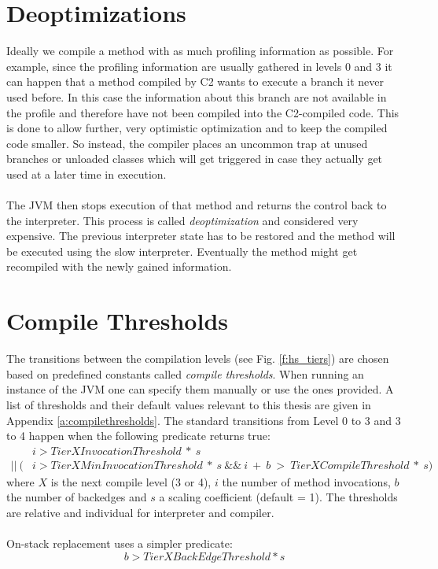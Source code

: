 \section{Deoptimizations}
\label{s:deoptimizations}
Ideally we compile a method with as much profiling information as possible.
For example, since the profiling information are usually gathered in levels 0 and 3 it can happen that a method compiled by C2 wants to execute a branch it never used before.
In this case the information about this branch are not available in the profile and therefore have not been compiled into the C2-compiled code.
This is done to allow further, very optimistic optimization and to keep the compiled code smaller. So instead, the compiler places an uncommon trap at unused branches or unloaded classes which will get triggered in case they actually get used at a later time in execution.
\\\\
The JVM then stops execution of that method and returns the control back to the interpreter. This process is called \textit{deoptimization} and considered very expensive. The previous interpreter state has to be restored and the method will be executed using the slow interpreter. Eventually the method might get recompiled with the newly gained information.

\section{Compile Thresholds}
\label{s:compilethresholds}
The transitions between the compilation levels (see Fig. \ref{f:hs_tiers}) are chosen based on predefined constants called \textit{compile thresholds}. When running an instance of the JVM one can specify them manually or use the ones provided. A list of thresholds and their default values relevant to this thesis are given in Appendix \ref{a:compilethresholds}.
The standard transitions from Level 0 to 3 and 3 to 4 happen when the following predicate returns true:
\begin{align*}
& i > TierXInvocationThreshold \ * \ s \\
 || \ (&i > TierXMinInvocationThreshold \ * \ s \ \&\& \ i \ + \ b \ > \ TierXCompileThreshold \ * \ s) 
\end{align*}
where $X$ is the next compile level (3 or 4), $i$ the number of method invocations, $b$ the number of backedges and $s$ a scaling coefficient (default = 1).
The thresholds are relative and individual for interpreter and compiler.
\\\\
On-stack replacement uses a simpler predicate:
$$b > TierXBackEdgeThreshold * s$$

